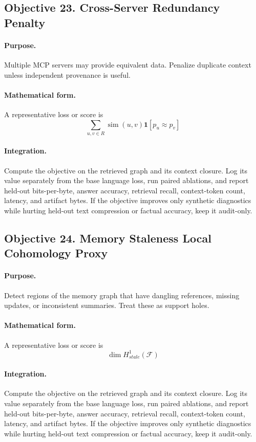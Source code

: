 \documentclass[11pt]{article}
\theoremstyle{definition}
\theoremstyle{remark}
\begin{document}
\subsection{Objective 23. Cross-Server Redundancy Penalty}
\paragraph{Purpose.} Multiple MCP servers may provide equivalent data. Penalize duplicate context unless independent provenance is useful.

\paragraph{Mathematical form.} A representative loss or score is
\[
    \sum_{u,v\in R}\operatorname{sim}(u,v)\mathbf 1[p_u\approx p_v]
\]

\paragraph{Integration.} Compute the objective on the retrieved graph and its context closure. Log its value separately from the base language loss, run paired ablations, and report held-out bits-per-byte, answer accuracy, retrieval recall, context-token count, latency, and artifact bytes. If the objective improves only synthetic diagnostics while hurting held-out text compression or factual accuracy, keep it audit-only.


\subsection{Objective 24. Memory Staleness Local Cohomology Proxy}
\paragraph{Purpose.} Detect regions of the memory graph that have dangling references, missing updates, or inconsistent summaries. Treat these as support holes.

\paragraph{Mathematical form.} A representative loss or score is
\[
    \dim H^1_{stale}(\mathcal F)
\]

\paragraph{Integration.} Compute the objective on the retrieved graph and its context closure. Log its value separately from the base language loss, run paired ablations, and report held-out bits-per-byte, answer accuracy, retrieval recall, context-token count, latency, and artifact bytes. If the objective improves only synthetic diagnostics while hurting held-out text compression or factual accuracy, keep it audit-only.
\end{document}
